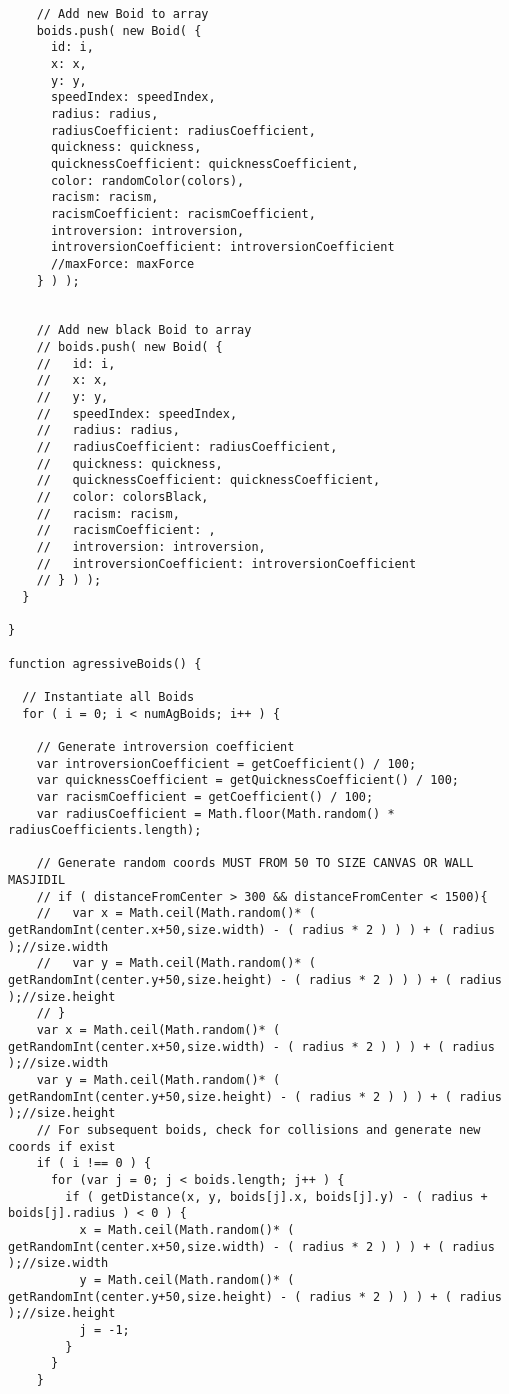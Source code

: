 \begin{lstlisting}
    // Add new Boid to array
    boids.push( new Boid( {
      id: i,
      x: x,
      y: y,
      speedIndex: speedIndex,
      radius: radius,
      radiusCoefficient: radiusCoefficient,
      quickness: quickness,
      quicknessCoefficient: quicknessCoefficient,
      color: randomColor(colors),
      racism: racism,
      racismCoefficient: racismCoefficient,
      introversion: introversion,
      introversionCoefficient: introversionCoefficient
      //maxForce: maxForce
    } ) );


    // Add new black Boid to array 
    // boids.push( new Boid( {
    //   id: i,
    //   x: x,
    //   y: y,
    //   speedIndex: speedIndex,
    //   radius: radius,
    //   radiusCoefficient: radiusCoefficient,
    //   quickness: quickness,
    //   quicknessCoefficient: quicknessCoefficient,
    //   color: colorsBlack,
    //   racism: racism,
    //   racismCoefficient: ,
    //   introversion: introversion,
    //   introversionCoefficient: introversionCoefficient
    // } ) );
  }

}

function agressiveBoids() {

  // Instantiate all Boids
  for ( i = 0; i < numAgBoids; i++ ) {

    // Generate introversion coefficient
    var introversionCoefficient = getCoefficient() / 100;
    var quicknessCoefficient = getQuicknessCoefficient() / 100;
    var racismCoefficient = getCoefficient() / 100;
    var radiusCoefficient = Math.floor(Math.random() * radiusCoefficients.length);

    // Generate random coords MUST FROM 50 TO SIZE CANVAS OR WALL MASJIDIL
    // if ( distanceFromCenter > 300 && distanceFromCenter < 1500){
    //   var x = Math.ceil(Math.random()* ( getRandomInt(center.x+50,size.width) - ( radius * 2 ) ) ) + ( radius );//size.width
    //   var y = Math.ceil(Math.random()* ( getRandomInt(center.y+50,size.height) - ( radius * 2 ) ) ) + ( radius );//size.height
    // }
    var x = Math.ceil(Math.random()* ( getRandomInt(center.x+50,size.width) - ( radius * 2 ) ) ) + ( radius );//size.width
    var y = Math.ceil(Math.random()* ( getRandomInt(center.y+50,size.height) - ( radius * 2 ) ) ) + ( radius );//size.height
    // For subsequent boids, check for collisions and generate new coords if exist
    if ( i !== 0 ) {
      for (var j = 0; j < boids.length; j++ ) {
        if ( getDistance(x, y, boids[j].x, boids[j].y) - ( radius + boids[j].radius ) < 0 ) {
          x = Math.ceil(Math.random()* ( getRandomInt(center.x+50,size.width) - ( radius * 2 ) ) ) + ( radius );//size.width
          y = Math.ceil(Math.random()* ( getRandomInt(center.y+50,size.height) - ( radius * 2 ) ) ) + ( radius );//size.height
          j = -1;
        }
      }
    }


\end{lstlisting}
